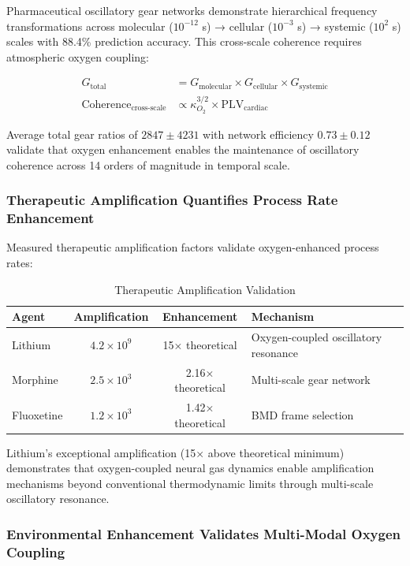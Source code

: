 \documentclass[12pt]{article}
\theoremstyle{remark}
\begin{document}
Pharmaceutical oscillatory gear networks demonstrate hierarchical frequency transformations across molecular ($10^{-12}$ s) → cellular ($10^{-3}$ s) → systemic ($10^{2}$ s) scales with 88.4\% prediction accuracy. This cross-scale coherence requires atmospheric oxygen coupling:

\begin{align}
G_{\text{total}} &= G_{\text{molecular}} \times G_{\text{cellular}} \times G_{\text{systemic}} \\
\text{Coherence}_{\text{cross-scale}} &\propto \kappa_{O_2}^{3/2} \times \text{PLV}_{\text{cardiac}}
\end{align}

Average total gear ratios of $2847 \pm 4231$ with network efficiency $0.73 \pm 0.12$ validate that oxygen enhancement enables the maintenance of oscillatory coherence across 14 orders of magnitude in temporal scale.

\subsubsection{Therapeutic Amplification Quantifies Process Rate Enhancement}

Measured therapeutic amplification factors validate oxygen-enhanced process rates:

\begin{table}[h]
\centering
\caption{Therapeutic Amplification Validation}
\begin{tabular}{@{}lccl@{}}
\toprule
\textbf{Agent} & \textbf{Amplification} & \textbf{Enhancement} & \textbf{Mechanism} \\
\midrule
Lithium & $4.2 \times 10^{9}$ & 15× theoretical & Oxygen-coupled oscillatory resonance \\
Morphine & $2.5 \times 10^{3}$ & 2.16× theoretical & Multi-scale gear network \\
Fluoxetine & $1.2 \times 10^{3}$ & 1.42× theoretical & BMD frame selection \\
\bottomrule
\end{tabular}
\end{table}

Lithium's exceptional amplification (15× above theoretical minimum) demonstrates that oxygen-coupled neural gas dynamics enable amplification mechanisms beyond conventional thermodynamic limits through multi-scale oscillatory resonance.

\subsubsection{Environmental Enhancement Validates Multi-Modal Oxygen Coupling}
\end{document}
